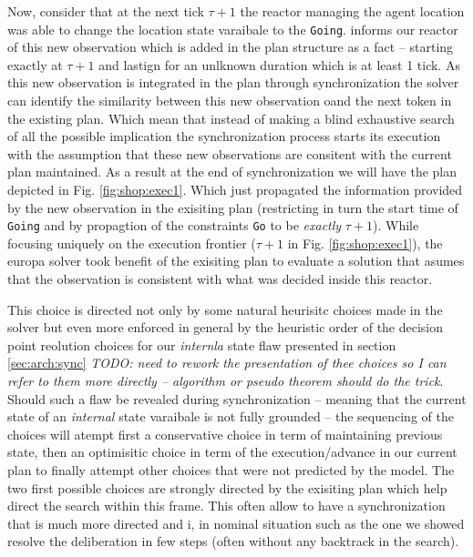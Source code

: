 Now, consider that at the next tick $\tau+1$ the reactor managing the
agent location was able to change the location state varaibale to the
\texttt{Going}. \rx informs our reactor of this new observation which
is added in the plan structure as a fact -- starting exactly at
$\tau+1$ and lastign for an unlknown duration which is at least 1
tick. As this new observation is integrated in the plan through
synchronization the solver can identify the similarity between this
new observation oand the next token in the existing plan. Which mean
that instead of making a blind exhaustive search of all the possible
implication the synchronization process starts its execution with the
assumption that these new observations are consitent with the current
plan maintained. As a result at the end of synchronization we will
have the plan depicted in Fig. \ref{fig:shop:exec1}. Which just
propagated the information provided by the new observation in the
exisiting plan (restricting in turn the start time of \texttt{Going}
and by propagtion of the constraints \texttt{Go} to be {\em exactly}
$\tau+1$). While focusing uniquely on the execution frontier ($\tau+1$
in Fig. \ref{fig:shop:exec1}), the europa solver took benefit of the
exisiting plan to evaluate a solution that asumes that the observation
is consistent with what was decided inside this reactor.


This choice is directed not only by some natural heurisitc choices
made in the solver but even more enforced in general by the heuristic
order of the decision point reolution choices for our {\em internla}
state flaw presented in section \ref{sec:arch:sync} {\em\color{red}
  TODO: need to rework the presentation of thee choices so I can refer
  to them more directly -- algorithm or pseudo theorem should do the
  trick}. Should such a flaw be revealed during synchronization --
meaning that the current state of an {\em internal} state varaibale is
not fully grounded -- the sequencing of the choices will atempt first
a conservative choice in term of maintaining previous state, then an
optimisitic choice in term of the execution/advance in our current
plan to finally attempt other choices that were not predicted by the
model. The two first possible choices are strongly directed by the
exisiting plan which help direct the search within this frame. This
often allow to have a synchronization that is much more directed and
i, in nominal situation such as the one we showed resolve the
deliberation in few steps (often without any backtrack in the search).

